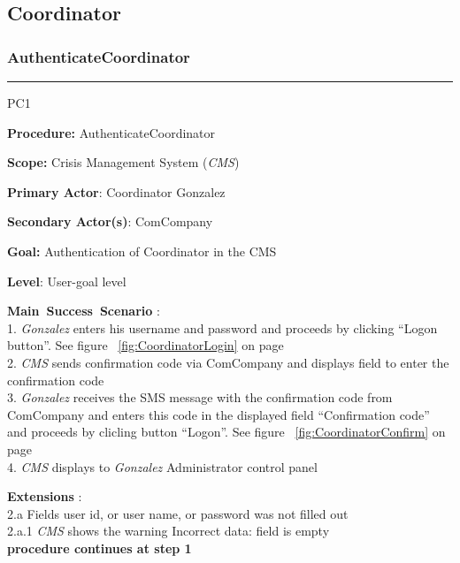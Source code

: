 \subsection{Coordinator}

\subsubsection{AuthenticateCoordinator}

\vspace{0.5cm}
\hrule
\begin{lyxlist}{PC1}
\small{
\item [\textbf{Procedure:}] AuthenticateCoordinator
\item [\textbf{Scope:}] Crisis Management System (\emph{CMS})
\item [\textbf{Primary Actor}:] Coordinator Gonzalez
\item [\textbf{Secondary Actor(s)}:] ComCompany
\item [\textbf{Goal:}] Authentication of Coordinator in the CMS
\item [\textbf{Level}:] User-goal level
\item [\textbf{Main~Success~Scenario}]:\\
1. \emph{Gonzalez} enters his username and password and proceeds by clicking
``Logon button''. See figure ~\ref{fig:CoordinatorLogin} on
page~\pageref{fig:CoordinatorLogin}\\
2. \emph{CMS} sends confirmation code via ComCompany and displays field to enter
the confirmation code\\
3. \emph{Gonzalez} receives the SMS message with the confirmation code from
ComCompany and enters this code in the displayed field ``Confirmation code''
and proceeds by clicling button ``Logon''. See figure
~\ref{fig:CoordinatorConfirm} on page ~\pageref{fig:CoordinatorConfirm}\\
4. \emph{CMS} displays to \emph{Gonzalez} Administrator control panel

\item [\textbf{Extensions}]:\\
2.a Fields user id, or user name, or password was not filled out\\
\hspace*{0.5cm} 2.a.1 \emph{CMS} shows the warning Incorrect data: field is
empty\\
\hspace*{0.5cm} \textbf{procedure continues at step 1}

}
\end{lyxlist}
